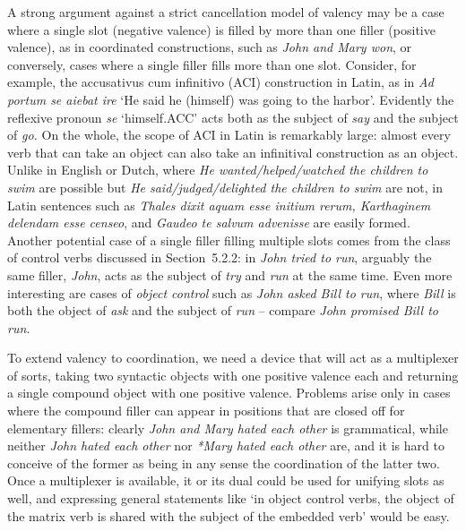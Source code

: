 A strong argument against a strict cancellation model of valency may be a case
where a single slot (negative valence) is filled by more than one filler
(positive valence), as in coordinated constructions, such as {\it John and
  Mary won}, or conversely, cases where a single filler fills more than one
slot.  Consider, for example, the accusativus cum infinitivo (ACI)
construction in Latin, as in {\it Ad portum se aiebat ire} `He said he
(himself) was going to the harbor'. Evidently the reflexive pronoun {\it se}
`himself.ACC' acts both as the subject of {\it say} and the subject of {\it
  go.} On the whole, the
scope of ACI in Latin is remarkably large: almost every verb that can take an
object can also take an infinitival construction as an object.  Unlike in
English or Dutch, where {\it He wanted/helped/watched the children to swim}
are possible but {\it *He said/judged/delighted the children to swim} are not,
in Latin sentences such as {\it Thales dixit aquam esse initium rerum,
  Karthaginem delendam esse censeo}, and {\it Gaudeo te salvum advenisse} are
easily formed.  Another potential case of a single filler filling multiple
slots comes from the class of control verbs discussed in Section~5.2.2: in
{\it John tried to run}, arguably the same filler, {\it John}, acts as the
subject of {\it try} and {\it run} at the same time. Even more interesting are
cases of {\it object control} such as {\it John asked Bill to run}, where {\it
  Bill} is both the object of {\it ask} and the subject of {\it run} --
compare {\it John promised Bill to run.}

To extend valency to coordination, we need a device that will act as a
multiplexer of sorts, taking two syntactic objects with one positive valence
each and returning a single compound object with one positive valence.
Problems arise only in cases where the compound filler can appear in positions
that are closed off for elementary fillers: clearly {\it John and Mary hated
each other} is grammatical, while neither {\it *John hated each other} nor {\it
*Mary hated each other} are, and it is hard to conceive of the former as being
in any sense the coordination of the latter two.  Once a multiplexer is
available, it or its dual could be used for unifying slots as well, and
expressing general statements like `in object control verbs, the object of the
matrix verb is shared with the subject of the embedded verb' would be easy.

